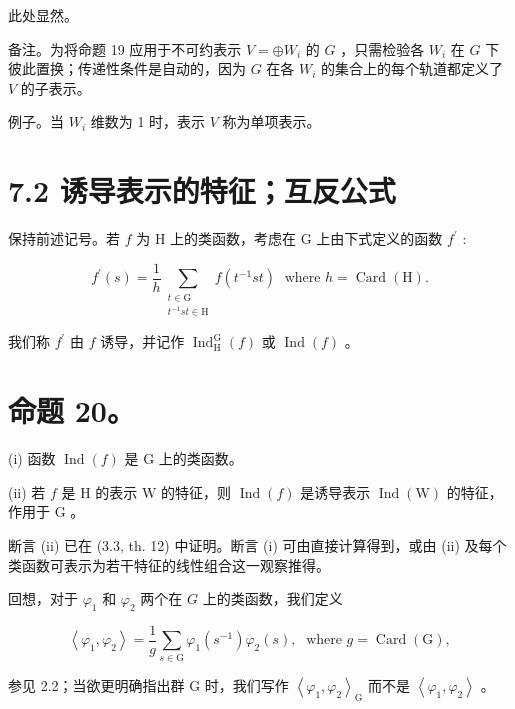 \documentclass[10pt]{article}
\begin{document}
此处显然。

备注。为将命题 19 应用于不可约表示 \(V =  \oplus  {W}_{i}\) 的 \(G\) ，只需检验各 \({W}_{i}\) 在 \(G\) 下彼此置换；传递性条件是自动的，因为 \(G\) 在各 \({W}_{i}\) 的集合上的每个轨道都定义了 \(V\) 的子表示。

例子。当 \({W}_{i}\) 维数为 1 时，表示 \(V\) 称为单项表示。

\section*{7.2 诱导表示的特征；互反公式}

保持前述记号。若 \(f\) 为 \(\mathrm{H}\) 上的类函数，考虑在 \(\mathrm{G}\) 上由下式定义的函数 \({f}^{\prime }\) :

\[
{f}^{\prime }\left( s\right)  = \frac{1}{h}\mathop{\sum }\limits_{\substack{{t \in  \mathrm{G}} \\  {{t}^{-1}{st} \in  \mathrm{H}} }}f\left( {{t}^{-1}{st}}\right) \;\text{ where }h = \operatorname{Card}\left( \mathrm{H}\right) .
\]

我们称 \({f}^{\prime }\) 由 \(f\) 诱导，并记作 \({\operatorname{Ind}}_{\mathrm{H}}^{\mathrm{G}}\left( f\right)\) 或 \(\operatorname{Ind}\left( f\right)\) 。

\section*{命题 20。}

(i) 函数 \(\operatorname{Ind}\left( f\right)\) 是 \(\mathrm{G}\) 上的类函数。

(ii) 若 \(f\) 是 \(\mathrm{H}\) 的表示 \(\mathrm{W}\) 的特征，则 \(\operatorname{Ind}\left( f\right)\) 是诱导表示 \(\operatorname{Ind}\left( \mathrm{W}\right)\) 的特征，作用于 \(\mathrm{G}\) 。

断言 (ii) 已在 (3.3, th. 12) 中证明。断言 (i) 可由直接计算得到，或由 (ii) 及每个类函数可表示为若干特征的线性组合这一观察推得。

回想，对于 \({\varphi }_{1}\) 和 \({\varphi }_{2}\) 两个在 \(G\) 上的类函数，我们定义

\[
\left\langle  {{\varphi }_{1},{\varphi }_{2}}\right\rangle   = \frac{1}{g}\mathop{\sum }\limits_{{s \in  \mathrm{G}}}{\varphi }_{1}\left( {s}^{-1}\right) {\varphi }_{2}\left( s\right) ,\;\text{ where }g = \operatorname{Card}\left( \mathrm{G}\right) ,
\]

参见 2.2；当欲更明确指出群 G 时，我们写作 \({\left\langle  {\varphi }_{1},{\varphi }_{2}\right\rangle  }_{\mathrm{G}}\) 而不是 \(\left\langle  {{\varphi }_{1},{\varphi }_{2}}\right\rangle\) 。
\end{document}
